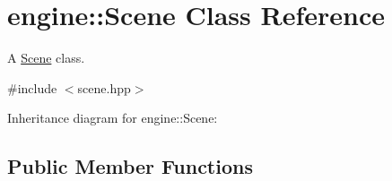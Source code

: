 \hypertarget{classengine_1_1_scene}{}\section{engine\+:\+:Scene Class Reference}
\label{classengine_1_1_scene}


A \hyperlink{classengine_1_1_scene}{Scene} class.  




{\ttfamily \#include $<$scene.\+hpp$>$}



Inheritance diagram for engine\+:\+:Scene\+:
\subsection*{Public Member Functions}
